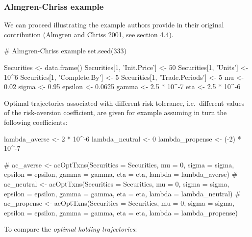 \hypertarget{almgren-chriss-example}{%
\subsubsection{Almgren-Chriss example}\label{almgren-chriss-example}}

We can proceed illustrating the example authors provide in their
original contribution (Almgren and Chriss 2001, see section 4.4).

\begin{Schunk}
\begin{Sinput}
# Almgren-Chriss example
set.seed(333)

Securities <- data.frame()
Securities[1, 'Init.Price'] <- 50
Securities[1, 'Units'] <- 10^6
Securities[1, 'Complete.By'] <- 5
Securities[1, 'Trade.Periods'] <- 5
mu <- 0.02
sigma <- 0.95
epsilon <- 0.0625
gamma <- 2.5 * 10^-7 
eta <- 2.5 * 10^-6 
\end{Sinput}
\end{Schunk}

Optimal trajectories associated with different risk tolerance,
i.e.~different values of the risk-aversion coefficient, are given for
example assuming in turn the following coefficients:

\begin{Schunk}
\begin{Sinput}
lambda_averse <- 2 * 10^-6
lambda_neutral <- 0
lambda_propense <- (-2) * 10^-7

# ac_averse <- acOptTxns(Securities = Securities, mu = 0, sigma = sigma, epsilon = epsilon, gamma = gamma, eta = eta, lambda = lambda_averse)
# ac_neutral <- acOptTxns(Securities = Securities, mu = 0, sigma = sigma, epsilon = epsilon, gamma = gamma, eta = eta, lambda = lambda_neutral)
# ac_propense <- acOptTxns(Securities = Securities, mu = 0, sigma = sigma, epsilon = epsilon, gamma = gamma, eta = eta, lambda = lambda_propense)
\end{Sinput}
\end{Schunk}

To compare the \emph{optimal holding trajectories}:

\begin{Schunk}
\end{Schunk}

